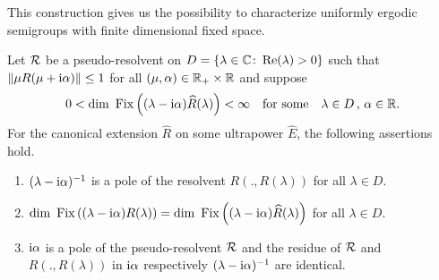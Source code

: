 This construction gives us the possibility to characterize uniformly ergodic semigroups with finite dimensional fixed space.
\begin{lemma}\label{lem:d3-2.2}
Let $\mathcal{R}$ be a pseudo-resolvent on $D = \{\lambda \in \mathbb{C} \colon \mathop{}\!\mathrm{Re}(\lambda) > 0\}$ such that $\|\mu R(\mu+\im\alpha)\| \leq 1$ for all $(\mu,\alpha) \in \mathbb{R}_{+} \times \mathbb{R}$ and suppose
\[
0 < \mathop{}\!\mathrm{dim}\, \mathop{}\mathrm{Fix}\left((\lambda-\mathrm{i}\alpha)\widehat{R}(\lambda)\right) < \infty \quad \text{for some} \quad \lambda \in D \, , \, \alpha \in \mathbb{R} .
\]
For the canonical extension $\widehat{R}$ on some ultrapower $\widehat{E}$, the following assertions hold.
\begin{enumerate}[\upshape (i)]
\item\label{d3-2.2-i}
$(\lambda - \mathrm{i}\alpha)^{-1}$ is a pole of the resolvent $R(.,R(\lambda))$ for all $\lambda \in D$.

\item\label{d3-2.2-ii}
$\mathop{}\!\mathrm{dim}\, \mathop{}\mathrm{Fix}\left((\lambda-\mathrm{i}\alpha)R(\lambda)\right) 
	= \mathop{}\!\mathrm{dim}\, \mathop{}\mathrm{Fix}\left((\lambda-\mathrm{i}\alpha)\widehat{R}(\lambda)\right)$ for all $\lambda \in D$.

\item\label{d3-2.2-iii}
$\mathrm{i}\alpha$ is a pole of the pseudo-resolvent $\mathcal{R}$ and the residue of\/ $\mathcal{R}$ and $R(.,R(\lambda))$ in $\mathrm{i}\alpha$ respectively $(\lambda - \mathrm{i}\alpha)^{-1}$ are identical.

\end{enumerate}
\end{lemma}
